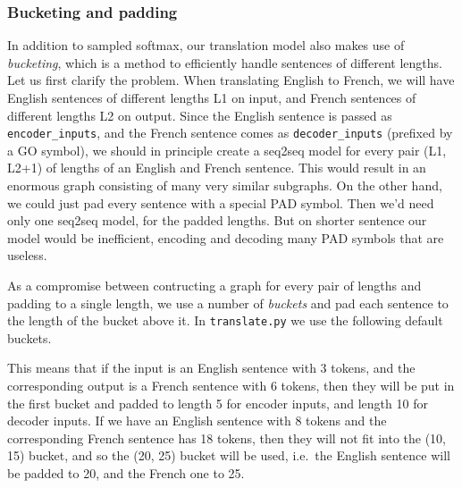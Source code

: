 \subsubsection{Bucketing and padding }\label{bucketing-and-padding}

In addition to sampled softmax, our translation model also makes use of
\emph{bucketing}, which is a method to efficiently handle sentences of
different lengths. Let us first clarify the problem. When translating
English to French, we will have English sentences of different lengths
L1 on input, and French sentences of different lengths L2 on output.
Since the English sentence is passed as \texttt{encoder\_inputs}, and
the French sentence comes as \texttt{decoder\_inputs} (prefixed by a GO
symbol), we should in principle create a seq2seq model for every pair
(L1, L2+1) of lengths of an English and French sentence. This would
result in an enormous graph consisting of many very similar subgraphs.
On the other hand, we could just pad every sentence with a special PAD
symbol. Then we'd need only one seq2seq model, for the padded lengths.
But on shorter sentence our model would be inefficient, encoding and
decoding many PAD symbols that are useless.

As a compromise between contructing a graph for every pair of lengths
and padding to a single length, we use a number of \emph{buckets} and
pad each sentence to the length of the bucket above it. In
\texttt{translate.py} we use the following default buckets.

\begin{Shaded}
\begin{Highlighting}[]
\OperatorTok{=} \NormalTok{[(}\NormalTok{, }\NormalTok{), (}\NormalTok{, }\NormalTok{), (}\NormalTok{, }\NormalTok{), (}\NormalTok{, }\NormalTok{)]}
\end{Highlighting}
\end{Shaded}

This means that if the input is an English sentence with 3 tokens, and
the corresponding output is a French sentence with 6 tokens, then they
will be put in the first bucket and padded to length 5 for encoder
inputs, and length 10 for decoder inputs. If we have an English sentence
with 8 tokens and the corresponding French sentence has 18 tokens, then
they will not fit into the (10, 15) bucket, and so the (20, 25) bucket
will be used, i.e.~the English sentence will be padded to 20, and the
French one to 25.

